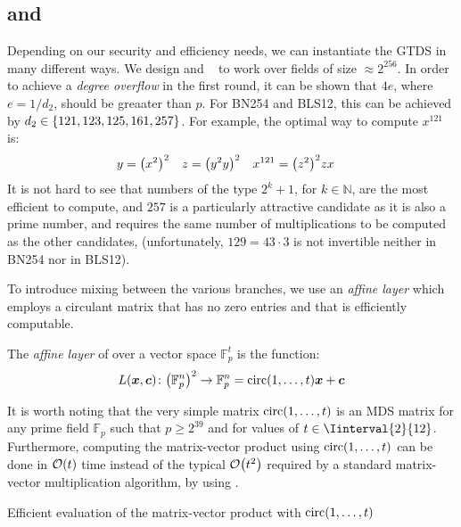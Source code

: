 \subsection{\Arion{} and \Arionhash{}}
Depending on our security and efficiency needs, we can instantiate the GTDS in many different 
ways.
We design \Arion{} and \Arionhash{}~\textbf{\cite{RoyST2023}} to work over fields of size 
\(\approx 2^{256}\).
In order to achieve a \emph{degree overflow} in the first round, it can be shown that \(4e\), where 
\(e = {1}/{d_2}\), should be greaater than \(p\). 
For BN254 and BLS12, this can be achieved by \(d_2 \in \left\{121, 123, 125, 161, 257\right\}\).
For example, the optimal way to compute \(x^{121}\) is:
\begin{align*}
  & y = \Parens*{x^{2}}^{2} && z = \Parens*{y^{2}y}^{2} && x^{121} = \Parens*{z^{2}}^{2}zx
\end{align*}
It is not hard to see that numbers of the type \(2^k + 1\), for \(k \in \mathbb{N}\), are the 
most efficient to compute, and \(257\) is a particularly attractive candidate as it is also a 
prime number, and requires the same number of multiplications to be computed as the other candidates, 
(unfortunately, \(129 = 43 \cdot 3\) is not invertible neither in BN254 nor in BLS12).

To introduce mixing between the various branches, we use an \emph{affine layer} which employs a 
circulant matrix that has no zero entries and that is efficiently computable.
\begin{definition}
  The \emph{affine layer} of \Arion{} over a vector space \(\mathbb{F}_p^t\) is the function:
  \[\call{L}{\bm{x}, \bm{c}}\colon \Parens*{\mathbb{F}_p^n}^2 \to \mathbb{F}_p^n = 
  \call{\circulant}{1, \dots, t}\bm{x} + \bm{c}\]
\end{definition}

It is worth noting that the very simple matrix \(\call{\circulant}{1, \dots, t}\) is an MDS matrix
for any prime field \(\mathbb{F}_p\) such that \(p \ge 2^{39}\) and for values of
\(t \in \Iinterval{2}{12}\).
Furthermore, computing the matrix-vector product using \(\call{\circulant}{1, \dots, t}\) can be 
done in \(\BigO{t}\) time instead of the typical \(\BigO{t^2}\) required by a standard matrix-vector 
multiplication algorithm, by using .
\begin{algorithm}
  \begin{algorithmic}
    \EndFor{}
    \EndFunction{}
  \end{algorithmic}
  \caption{Efficient evaluation of the matrix-vector product with 
    \(\call{\circulant}{1, \dots, t}\)}\label{alg:circ_mult}
\end{algorithm}

